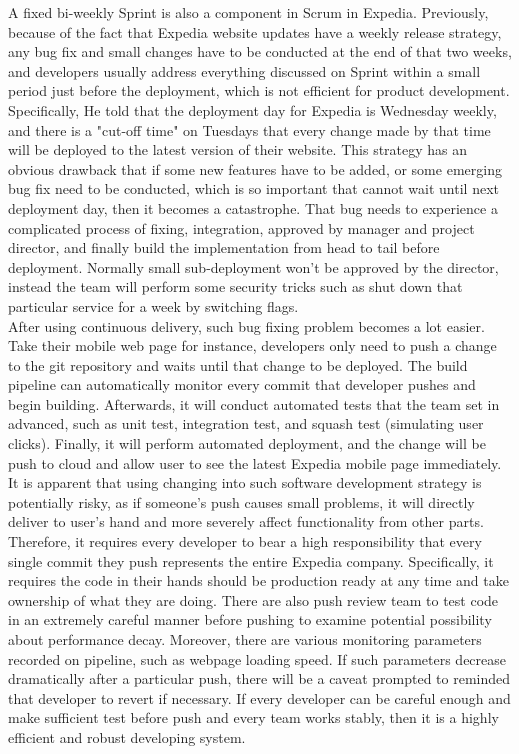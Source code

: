 \documentclass[11pt]{article}
\begin{document}
A fixed bi-weekly Sprint is also a component in Scrum in Expedia. Previously, because of the fact that Expedia website updates have a weekly release strategy, any bug fix and small changes have to be conducted at the end of that two weeks, and developers usually address everything discussed on Sprint within a small period just before the deployment, which is not efficient for product development. Specifically, He told that the deployment day for Expedia is Wednesday weekly, and there is a "cut-off time" on Tuesdays that every change made by that time will be deployed to the latest version of their website. This strategy has an obvious drawback that if some new features have to be added, or some emerging bug fix need to be conducted, which is so important that cannot wait until next deployment day, then it becomes a catastrophe. That bug needs to experience a complicated process of fixing, integration, approved by manager and project director, and finally build the implementation from head to tail before deployment. Normally small sub-deployment won't be approved by the director, instead the team will perform some security tricks such as shut down that particular service for a week by switching flags. \\[10px]
After using continuous delivery, such bug fixing problem becomes a lot easier. Take their mobile web page for instance, developers only need to push a change to the git repository and waits until that change to be deployed. The build pipeline can automatically monitor every commit that developer pushes and begin building. Afterwards, it will conduct automated tests that the team set in advanced, such as unit test, integration test, and squash test (simulating user clicks). Finally, it will perform automated deployment, and the change will be push to cloud and allow user to see the latest Expedia mobile page immediately. It is apparent that using changing into such software development strategy is potentially risky, as if someone's push causes small problems, it will directly deliver to user's hand and more severely affect functionality from other parts. Therefore, it requires every developer to bear a high responsibility that every single commit they push represents the entire Expedia company. Specifically, it requires the code in their hands should be production ready at any time and take ownership of what they are doing. There are also push review team to test code in an extremely careful manner before pushing to examine potential possibility about performance decay. Moreover, there are various monitoring parameters recorded on pipeline, such as webpage loading speed. If such parameters decrease dramatically after a particular push, there will be a caveat prompted to reminded that developer to revert if necessary. If every developer can be careful enough and make sufficient test before push and every team works stably, then it is a highly efficient and robust developing system. \\[10px]
\end{document}
